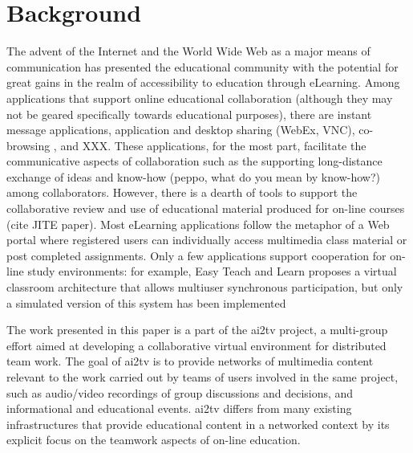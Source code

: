 \documentclass{sig-alternate}
\begin{document}
\section{Background} \label{background}
The advent of the Internet and the World Wide Web as a major means of
communication has presented the educational community with the
potential for great gains in the realm of accessibility to education
through eLearning.  Among applications that support online educational
collaboration (although they may not be geared specifically towards
educational purposes), there are instant message applications,
application and desktop sharing (WebEx, VNC), co-browsing \cite{CAPPS,
LIEBERMAN, SIDLER}, and XXX.  These applications, for the most part,
facilitate the communicative aspects of collaboration such as the
supporting long-distance exchange of ideas and know-how (peppo, what
do you mean by know-how?) among collaborators.  However, there is a
dearth of tools to support the collaborative review and use of
educational material produced for on-line courses (cite JITE paper).
Most eLearning applications follow the metaphor of a Web portal where
registered users can individually access multimedia class material or
post completed assignments.  Only a few applications support
cooperation for on-line study environments: for example, Easy Teach
and Learn proposes a virtual classroom architecture that allows
multiuser synchronous participation, but only a simulated version of
this system has been implemented \cite{WALTER}

The work presented in this paper is a part of the ai2tv
project, a multi-group effort aimed at developing a collaborative
virtual environment for distributed team work.  The goal of
ai2tv is to provide networks of multimedia content
relevant to the work carried out by teams of users involved in the
same project, such as audio/video recordings of group discussions and
decisions, and informational and educational events.
ai2tv differs from many existing infrastructures that
provide educational content in a networked context by its explicit
focus on the teamwork aspects of on-line education.


\end{document}
